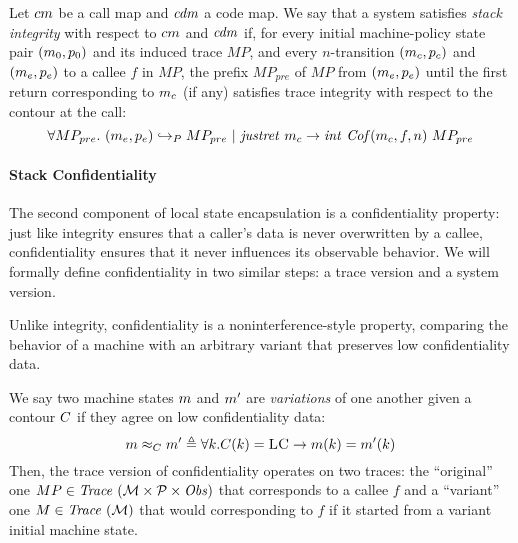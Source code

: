\documentclass[acmsmall,review,anonymous]{acmart}\settopmatter{printfolios=true,printccs=false,printacmref=false}
\begin{document}
Let $cm$ be a call map and $\mathit{cdm}$ a code map. We say that a
system satisfies {\em stack integrity} with respect to $cm$ and
$\mathit{cdm}$ if, for every initial machine-policy state pair $(m_0,
p_0)$ and its induced trace $MP$, and every $n$-transition
$(m_c, p_c)$ and $(m_e, p_e)$ to a callee $f$ in $MP$,
the prefix $MP_{pre}$ of $MP$ from $(m_e, p_e)$ until the first
return corresponding to $m_c$ (if any) satisfies trace integrity
with respect to the contour at the call:
%
$$\forall MP_{pre}. ~ (m_e,p_e) \hookrightarrow_P
MP_{pre} ~ | ~ \mathit{justret}\ m_c \rightarrow
\mathit{int}~\mathit{Cof}(m_c, f, n)~MP_{pre}$$

\paragraph*{Stack Confidentiality}

The second component of local state encapsulation is a confidentiality
property: just like integrity ensures that a caller's data is never
overwritten by a callee, confidentiality ensures that it never
influences its observable behavior. We will formally define
confidentiality in two similar steps: a trace version and a system
version.

Unlike integrity, confidentiality is a noninterference-style property,
comparing the behavior of a machine with an arbitrary variant that
preserves low confidentiality data.

We say two machine states $m$ and $m'$ are {\em variations} of one
another given a contour $C$ if they agree on low
confidentiality data:
%
\[
m \approx_C m' \triangleq \forall k .
C(k) = \textsc{LC} \rightarrow m(k) =
m'(k)
\]
%
Then, the trace version of confidentiality operates on two traces: the
``original'' one $MP \in \mathit{Trace}~({\mathcal M} \times \mathcal{P} \times \mathit{Obs})$ that corresponds to a callee $f$
and a ``variant'' one $M \in \mathit{Trace}~({\mathcal M})$ that would corresponding to $f$
if it started from a variant initial machine state.
\end{document}
